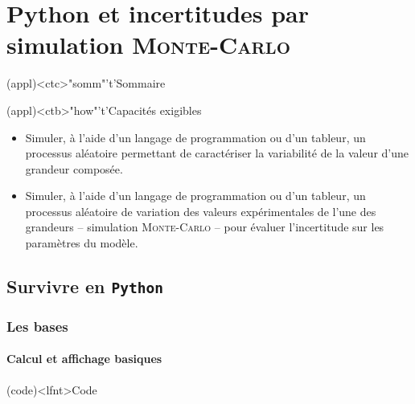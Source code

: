 \documentclass[a4paper, 12pt, garamond]{book}
\begin{document}
\setcounter{chapter}{4}


\chapter{Python et incertitudes par simulation \textsc{Monte-Carlo}}


\begin{tcn}(appl)<ctc>"somm"'t'{Sommaire}
	\let\item\olditem
	\vspace{-15pt}
	\minitoc
	\vspace{-25pt}
\end{tcn}

\begin{tcn}(appl)<ctb>"how"'t'{Capacités exigibles}
  \begin{itemize}[label=\rcheck]
      \item Simuler, à l'aide d’un langage de programmation ou d’un tableur, un
            processus aléatoire permettant de caractériser la variabilité de la
            valeur d’une grandeur composée.
      \item Simuler, à l'aide d’un langage de programmation ou d’un tableur, un
            processus aléatoire de variation des valeurs expérimentales de
            l'une des grandeurs – simulation \textsc{Monte-Carlo} – pour évaluer
            l'incertitude sur les paramètres du modèle.
  \end{itemize}
\end{tcn}


\section{Survivre en \texttt{Python}}
\subsection{Les bases}
\subsubsection{Calcul et affichage basiques}
\begin{tcb}(code)<lfnt>{Code}
\end{tcb}
\end{document}
